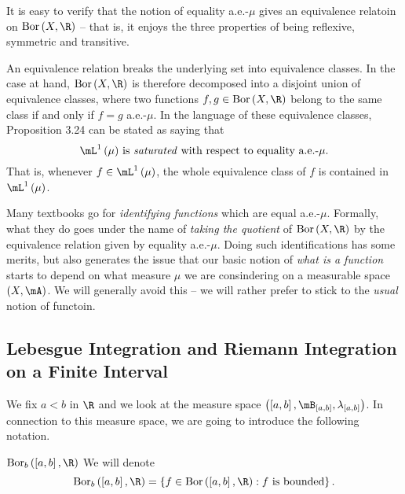 \documentclass[pmath450]{subfiles}
\begin{document}
    \np It is easy to verify that the notion of equality a.e.-$\mu$ gives an equivalence relatoin on $\bor\left( X,\R \right)$ -- that is, it enjoys the three properties of being reflexive, symmetric and transitive.

    An equivalence relation breaks the underlying set into equivalence classes. In the case at hand, $\bor\left( X,\R \right)$ is therefore decomposed into a disjoint union of equivalence classes, where two functions $f,g\in\bor\left( X,\R \right)$ belong to the same class if and only if $f=g$ a.e.-$\mu$. In the language of these equivalence classes, Proposition 3.24 can be stated as saying that
    \begin{equation*}
        \text{$\lone\left( \mu \right)$ is \textit{saturated} with respect to equality a.e.-$\mu$.}
    \end{equation*}
    That is, whenever $f\in\lone\left( \mu \right)$, the whole equivalence class of $f$ is contained in $\lone\left( \mu \right)$.

    \np Many textbooks go for \textit{identifying functions} which are equal a.e.-$\mu$. Formally, what they do goes under the name of \textit{taking the quotient} of $\bor\left( X,\R \right)$ by the equivalence relation given by equality a.e.-$\mu$. Doing such identifications has some merits, but also generates the issue that our basic notion of \textit{what is a function} starts to depend on what measure $\mu$ we are consindering on a measurable space $\left( X,\mA \right)$. We will generally avoid this -- we will rather prefer to stick to the \textit{usual} notion of functoin.

    \subsection{Lebesgue Integration and Riemann Integration on a Finite Interval}

    We fix $a<b$ in $\R$ and we look at the measure space $\left( \left[ a,b \right],\mB_{\left[ a,b \right]},\lambda_{\left[ a,b \right]} \right)$. In connection to this measure space, we are going to introduce the following notation.

    \begin{notation}{$\bor_b\left( \left[ a,b \right],\R \right)$}
        We will denote
        \begin{equation*}
            \bor_b\left( \left[ a,b \right],\R \right) = \left\lbrace f\in\bor\left( \left[ a,b \right],\R \right): f\text{ is bounded} \right\rbrace.
        \end{equation*}
    \end{notation}
    
\end{document}
